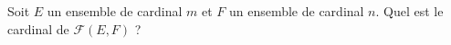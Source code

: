 Soit $E$ un ensemble de cardinal $m$ et $F$ un ensemble de cardinal $n$. Quel est le cardinal de $\mathcal F (E,F)$ ?

